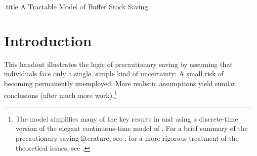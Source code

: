 \documentclass{\handout}
\begin{document}




\providecommand{\dmEqZero}{\ensuremath{\Delta\mRatE=0}}
\providecommand{\dcEqZero}{\ensuremath{\Delta\cRatE=0}}
\newcommand{\hideSup}{\makebox[0pt]{}}
\renewcommand{\MPCU}{\MPC} %
\newcommand{\Mma}{{\it Mathematica}~}
\renewcommand{\tSS}{\null}
\newcommand{\psav}{\cancel{c}}
\newcommand{\psavFunc}{\ensuremath{\cancel{\cFunc}}}
\newcommand{\crho}{\cancel{\rho}}
\newcommand{\nFuncP}{\nFunc^{\prime}}
\newcommand{\nFuncPP}{\nFunc^{\prime\prime}}
\newcommand{\nFuncPPP}{\nFunc^{\prime\prime\prime}}
\providecommand{\FHWCPGro}{FHWC$_{\PGro}$}
\providecommand{\FHWCWGro}{FHWC$_{\WGro}$}
\providecommand{\DiscountMaxRIC}{\ensuremath{\bar{\Discount}_{\text{RIC}}}}
\providecommand{\DiscountMaxGICTBS}{\bar{\Discount}_{\text{TBS}}}
\providecommand{\GICPGro}{GIC$_{\PGro}$}
\providecommand{\GICWGro}{GIC$_{\WGro}$}
\providecommand{\DiscountMaxGICPGro}{\bar{\Discount}_{\text{GIC}_\PGro}}
\providecommand{\DiscountMaxGICWGro}{\bar{\Discount}_{\text{GIC}_\WGro}}
\providecommand{\DiscountMaxGICWhenFHWCTBSHolds}{\ensuremath{\bar{\Discount}_{\text{FHW}}}}

\begin{verbatimwrite}{\jobname.title}
A Tractable Model of Buffer Stock Saving
\end{verbatimwrite}

\handoutNameMake

\section{Introduction} 
This handout illustrates the logic of precautionary saving by assuming that individuals face only a single, simple kind of uncertainty: A small risk of becoming permanently unemployed.  More realistic assumptions yield similar conclusions (after much more work).\footnote{The model simplifies many of the key results in \cite{carroll:brookings} and \cite{carrollBSLCPIH} using a discrete-time version of the elegant continuous-time model of \cite{toche:urisk}.  For a brief summary of the precautionary saving literature, see \cite{CarrollKimballPSPW}; for a more rigorous treatment of the theoretical issues, see \cite{BufferStockTheory}.}
\end{document}
